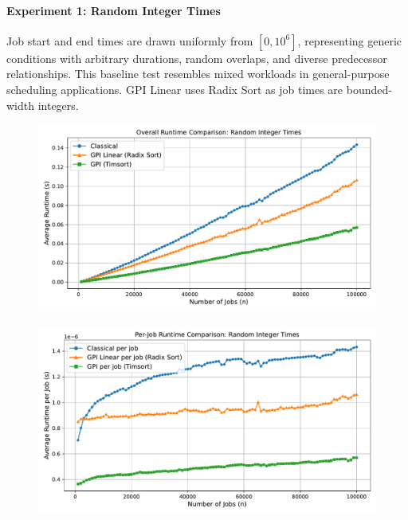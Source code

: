\documentclass[final,5p,times]{elsarticle}
\begin{document}
\paragraph{Experiment 1: Random Integer Times}
Job start and end times are drawn uniformly from $[0, 10^6]$, representing generic conditions with arbitrary durations, random overlaps, and diverse predecessor relationships. This baseline test resembles mixed workloads in general-purpose scheduling applications. GPI Linear uses Radix Sort as job times are bounded-width integers.
\vspace{-1em}
\begin{figure}[H]
    \centering
    \includegraphics[width=\linewidth]{figures/Random_Integer_Times_runtime_total.pdf}
    \label{fig:exp1-runtime-total}
\end{figure}
\vspace{-3em}
\begin{figure}[H]
    \centering
    \includegraphics[width=\linewidth]{figures/Random_Integer_Times_runtime_per_job.pdf}
    \label{fig:exp1-runtime-per-job}
\end{figure}
\vspace{-2em}
\end{document}

